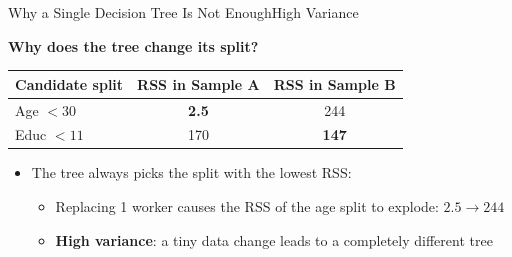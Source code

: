 \documentclass[hyperref={pdfpagelabels=false}]{beamer}
\begin{document}
\begin{frame}{Why a Single Decision Tree Is Not Enough}{High Variance}

\textbf{Why does the tree change its split?}

\vspace{0.2cm}
\begin{center}
\begin{tabular}{@{}lcc@{}}
  \toprule
  Candidate split & RSS in Sample A & RSS in Sample B \\
  \midrule
  Age $< 30$  & \textbf{2.5} & 244             \\
  Educ $< 11$ & 170          & \textbf{147}    \\
  \bottomrule
\end{tabular}
\end{center}

\vspace{0.2cm}
\begin{itemize}
\item The tree always picks the split with the lowest RSS:
  \vspace{0.15cm}
  \begin{itemize}
    \item Replacing 1 worker causes the RSS of the age split to explode:
          $2.5 \to 244$
          \vspace{0.2cm}
    \item[$\Rightarrow$] \textbf{High variance}: a tiny data change leads
          to a completely different tree
  \end{itemize}
\end{itemize}

\end{frame}
\end{document}
